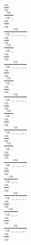 \documentclass[11pt]{article}
\begin{document}
\begin{center}
\bigskip
\\$\frac{\Rightarrow }{\Rightarrow }$
\bigskip
\\$\frac{\Rightarrow }{\Rightarrow , }$
\bigskip
\\$\frac{\Rightarrow }{\Rightarrow }$
\bigskip
\\$\frac{\Rightarrow }{\Rightarrow , , , , , , , }$
\bigskip
\\$\frac{\Rightarrow }{\Rightarrow }$
\bigskip
\\$\frac{\Rightarrow }{\Rightarrow , }$
\bigskip
\\$\frac{\Rightarrow }{\Rightarrow }$
\bigskip
\\$\frac{\Rightarrow }{\Rightarrow , , , , , , , }$
\bigskip
\\$\frac{\Rightarrow }{\Rightarrow }$
\bigskip
\\$\frac{\Rightarrow }{\Rightarrow , }$
\bigskip
\\$\frac{\Rightarrow }{\Rightarrow }$
\bigskip
\\$\frac{\Rightarrow }{\Rightarrow , , , , , , , }$
\bigskip
\\$\frac{\Rightarrow }{\Rightarrow }$
\bigskip
\\$\frac{\Rightarrow }{\Rightarrow , }$
\bigskip
\\$\frac{\Rightarrow }{\Rightarrow }$
\bigskip
\\$\frac{\Rightarrow }{\Rightarrow , , , , , , , }$
\bigskip
\\$\frac{\Rightarrow }{\Rightarrow }$
\bigskip
\\$\frac{\Rightarrow }{\Rightarrow , }$
\bigskip
\\$\frac{\Rightarrow }{\Rightarrow }$
\bigskip
\\$\frac{\Rightarrow }{\Rightarrow , , , , , , , }$
\bigskip
\\$\frac{\Rightarrow }{\Rightarrow }$
\bigskip
\\$\frac{\Rightarrow }{\Rightarrow , , , }$
\bigskip
\\$\frac{\Rightarrow }{\Rightarrow }$
\bigskip
\\$\frac{\Rightarrow }{\Rightarrow , , , , , , , }$
\bigskip
\\$\frac{\Rightarrow }{\Rightarrow }$
\bigskip
\\$\frac{\Rightarrow }{\Rightarrow , , , }$
\bigskip
\\$\frac{\Rightarrow }{\Rightarrow }$
\bigskip
\\$\frac{\Rightarrow }{\Rightarrow , , , , , , , }$
\bigskip
\\$\frac{\Rightarrow }{\Rightarrow }$

\end{center}
\end{document}
